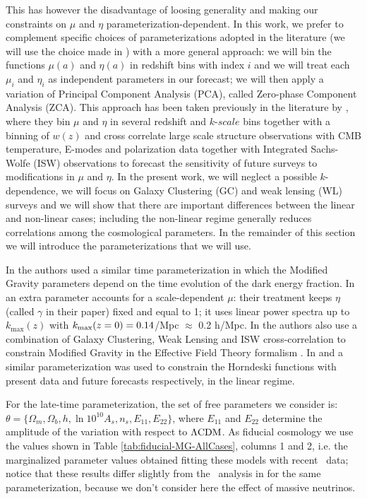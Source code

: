 This has however
the disadvantage of loosing generality and making our constraints
on $\mu$ and $\eta$ parameterization-dependent. In this
work, we prefer to complement specific choices of parameterizations
adopted in the literature (we will use the choice made in \cite{planck_collaboration_planck_2016}) 
with a more general approach: we will bin
the functions $\mu(a)$ and $\eta(a)$ in redshift bins with index
$i$ and we will treat each $\mu_{i}$ and $\eta_{i}$ as independent
parameters in our forecast; we will then apply a variation of Principal Component Analysis (PCA), called Zero-phase Component Analysis (ZCA).
This approach has been taken previously
in the literature by \cite{hojjati_cosmological_2012}, where they
bin $\mu$ and $\eta$ in several redshift and $k$-$scale$ bins
together with a binning of $w(z)$ and cross correlate large scale
structure observations with CMB temperature, E-modes and polarization
data together with Integrated Sachs-Wolfe (ISW) observations to forecast
the sensitivity of future surveys to modifications in $\mu$ and $\eta$.
In the present work, we will neglect a possible $k$-dependence, 
we will focus on Galaxy Clustering (GC) and weak
lensing (WL) surveys and we will show that there are important differences
between the linear and non-linear cases; including the non-linear regime generally reduces correlations
among the cosmological parameters. In the remainder of this section we will introduce the parameterizations that we will use.

In \cite{bull_extending_2015, Gleyzes2016, Alonso2016} the authors used a similar time parameterization in which the Modified Gravity
parameters depend on the time evolution of the dark energy fraction. In \cite{bull_extending_2015} an extra parameter accounts for a scale-dependent $\mu$: their treatment keeps $\eta$ (called $\gamma$ in their paper) fixed and equal to 1; it uses linear power spectra up to $k_{\mathrm{max}}(z)$ with $k_{\rm max}(z=0)=0.14$/Mpc $\approx$ 0.2 h/Mpc. 
In \cite{Gleyzes2016} the authors also use a combination of Galaxy Clustering, Weak Lensing and ISW cross-correlation to constrain
Modified Gravity in the Effective Field Theory formalism \cite{Gubitosi2013}. In \cite{Bellini2016} and \cite{Alonso2016} a similar parameterization was used to constrain the Horndeski functions \cite{Bellini2014} with present data and future forecasts respectively, in the linear regime.

For the late-time parameterization, the set of free parameters we
consider is: $\theta=\{\Omega_{m},\Omega_{b},h,\ln10^{10}A_{s},n_{s},E_{11},E_{22}\}$,
where $E_{11}$ and $E_{22}$ determine the amplitude of the variation
with respect to $\Lambda\mathrm{CDM}$. As fiducial cosmology we use the values
shown in Table \ref{tab:fiducial-MG-AllCases}, columns 1 and 2, i.e.
the marginalized parameter values obtained fitting these models with
recent \planck\ data; notice that these results differ slightly from
the \planck\ analysis in \cite{planck_collaboration_planck_2016} for
the same parameterization, because we don't consider here the effect
of massive neutrinos.

